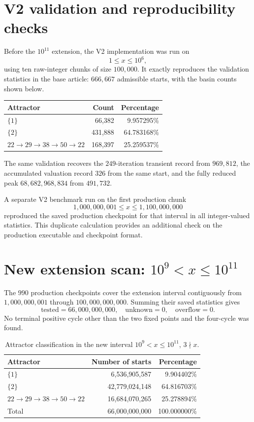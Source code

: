 \documentclass[11pt]{article}
\begin{document}
\section{V2 validation and reproducibility checks}
Before the $10^{11}$ extension, the V2 implementation was run on
\[
1\le x\le10^6,
\]
using ten raw-integer chunks of size $100,000$.  It exactly reproduces the validation statistics in the base article: $666,667$ admissible starts, with the basin counts shown below.
\begin{center}
\begin{tabular}{lrr}
\toprule
Attractor & Count & Percentage\\
\midrule
$\{1\}$ & 66,382 & 9.957295\%\\
$\{2\}$ & 431,888 & 64.783168\%\\
$22\to29\to38\to50\to22$ & 168,397 & 25.259537\%\\
\bottomrule
\end{tabular}
\end{center}
The same validation recovers the $249$-iteration transient record from $969,812$, the accumulated valuation record $326$ from the same start, and the fully reduced peak $68,682,968,834$ from $491,732$.

A separate V2 benchmark run on the first production chunk
\[
1,000,000,001\le x\le1,100,000,000
\]
reproduced the saved production checkpoint for that interval in all integer-valued statistics.  This duplicate calculation provides an additional check on the production executable and checkpoint format.

\section{New extension scan: $10^9<x\le10^{11}$}
The $990$ production checkpoints cover the extension interval contiguously from $1,000,000,001$ through $100,000,000,000$.  Summing their saved statistics gives
\begin{equation}
\boxed{\text{tested}=66,000,000,000,\quad
\text{unknown}=0,\quad
\text{overflow}=0.}
\end{equation}
No terminal positive cycle other than the two fixed points and the four-cycle was found.

\begin{table}[ht]
\centering
\caption{Attractor classification in the new interval $10^9<x\le10^{11}$, $3\nmid x$.}
\label{tab:extension}
\begin{tabular}{lrr}
\toprule
Attractor & Number of starts & Percentage\\
\midrule
$\{1\}$ & 6,536,905,587 & 9.904402\%\\
$\{2\}$ & 42,779,024,148 & 64.816703\%\\
$22\to29\to38\to50\to22$ & 16,684,070,265 & 25.278894\%\\
\midrule
Total & 66,000,000,000 & 100.000000\%\\
\bottomrule
\end{tabular}
\end{table}
\end{document}
